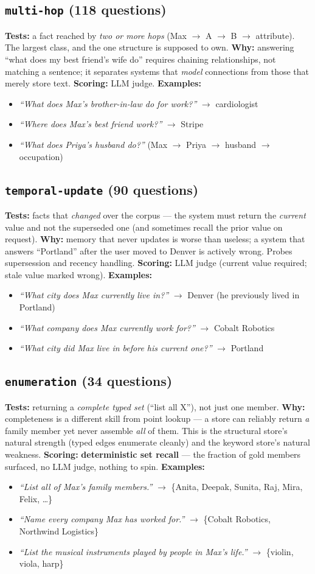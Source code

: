 \documentclass[11pt]{article}
\newcommand{\cat}[2]{\subsection{\texttt{#1} \normalfont\textmd{(#2)}}}
\begin{document}
\cat{multi-hop}{118 questions}
\textbf{Tests:} a fact reached by \emph{two or more hops} (Max $\to$ A $\to$ B $\to$ attribute). The largest
class, and the one structure is supposed to own. \textbf{Why:} answering ``what does my best friend's wife do''
requires chaining relationships, not matching a sentence; it separates systems that \emph{model} connections
from those that merely store text. \textbf{Scoring:} LLM judge. \textbf{Examples:}
\begin{itemize}[nosep]
  \item \emph{``What does Max's brother-in-law do for work?''} $\to$ cardiologist
  \item \emph{``Where does Max's best friend work?''} $\to$ Stripe
  \item \emph{``What does Priya's husband do?''} (Max $\to$ Priya $\to$ husband $\to$ occupation)
\end{itemize}

\cat{temporal-update}{90 questions}
\textbf{Tests:} facts that \emph{changed} over the corpus --- the system must return the \emph{current} value
and not the superseded one (and sometimes recall the prior value on request). \textbf{Why:} memory that never
updates is worse than useless; a system that answers ``Portland'' after the user moved to Denver is actively
wrong. Probes supersession and recency handling. \textbf{Scoring:} LLM judge (current value required; stale
value marked wrong). \textbf{Examples:}
\begin{itemize}[nosep]
  \item \emph{``What city does Max currently live in?''} $\to$ Denver (he previously lived in Portland)
  \item \emph{``What company does Max currently work for?''} $\to$ Cobalt Robotics
  \item \emph{``What city did Max live in before his current one?''} $\to$ Portland
\end{itemize}

\cat{enumeration}{34 questions}
\textbf{Tests:} returning a \emph{complete typed set} (``list all X''), not just one member. \textbf{Why:}
completeness is a different skill from point lookup --- a store can reliably return \emph{a} family member yet
never assemble \emph{all} of them. This is the structural store's natural strength (typed edges enumerate
cleanly) and the keyword store's natural weakness. \textbf{Scoring:} \textbf{deterministic set recall} ---
the fraction of gold members surfaced, no LLM judge, nothing to spin. \textbf{Examples:}
\begin{itemize}[nosep]
  \item \emph{``List all of Max's family members.''} $\to$ \{Anita, Deepak, Sunita, Raj, Mira, Felix, \ldots\}
  \item \emph{``Name every company Max has worked for.''} $\to$ \{Cobalt Robotics, Northwind Logistics\}
  \item \emph{``List the musical instruments played by people in Max's life.''} $\to$ \{violin, viola, harp\}
\end{itemize}
\end{document}
